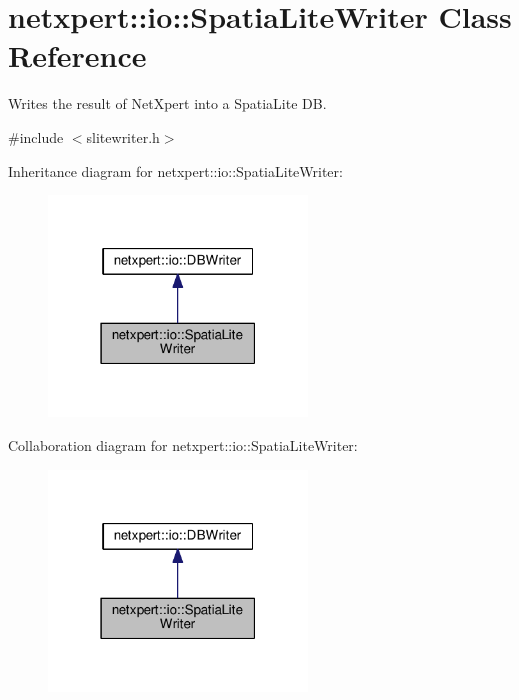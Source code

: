 \hypertarget{classnetxpert_1_1io_1_1SpatiaLiteWriter}{}\section{netxpert\+:\+:io\+:\+:Spatia\+Lite\+Writer Class Reference}
\label{classnetxpert_1_1io_1_1SpatiaLiteWriter}


Writes the result of Net\+Xpert into a Spatia\+Lite DB.  




{\ttfamily \#include $<$slitewriter.\+h$>$}



Inheritance diagram for netxpert\+:\+:io\+:\+:Spatia\+Lite\+Writer\+:\nopagebreak
\begin{figure}[H]
\begin{center}
\leavevmode
\includegraphics[width=195pt]{classnetxpert_1_1io_1_1SpatiaLiteWriter__inherit__graph}
\end{center}
\end{figure}


Collaboration diagram for netxpert\+:\+:io\+:\+:Spatia\+Lite\+Writer\+:\nopagebreak
\begin{figure}[H]
\begin{center}
\leavevmode
\includegraphics[width=195pt]{classnetxpert_1_1io_1_1SpatiaLiteWriter__coll__graph}
\end{center}
\end{figure}
